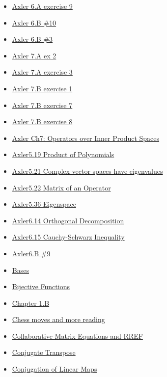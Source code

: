 \documentclass[11pt]{article}
\begin{document}
\begin{itemize}
\begin{itemize}
\item \href{math530/KBe21math530retAxler6A9.org}{Axler 6.A exercise 9}
\item \href{math530/KBe21math530retAxler6B10.org}{Axler 6.B \#10}
\item \href{math530/KBe21math530retAxler6B3.org}{Axler 6.B \#3}
\item \href{math530/KBe21math530retAxler7A2.org}{Axler 7.A ex 2}
\item \href{math530/KBe21math530retAxler7A3.org}{Axler 7.A exercise 3}
\item \href{math530/KBe21math530retAxler7B1.org}{Axler 7.B exercise 1}
\item \href{math530/KBe21math530retAxler7B7.org}{Axler 7.B exercise 7}
\item \href{math530/KBe21math530retAxler7B8.org}{Axler 7.B exercise 8}
\item \href{math530/KBrefOperatorsOverInnerProductSpaces.org}{Axler Ch7: Operators over Inner Product Spaces}
\item \href{math530/KBrefProductOfPolynomials.org}{Axler5.19 Product of Polynomials}
\item \href{math530/KBrefComplexOperatorsHaveEigenvalues.org}{Axler5.21 Complex vector spaces have eigenvalues}
\item \href{math530/KBrefMatrixOfAnOperator.org}{Axler5.22 Matrix of an Operator}
\item \href{math530/KBrefEigenspace.org}{Axler5.36 Eigenspace}
\item \href{math530/KBrefOrthogonalDecomposition.org}{Axler6.14 Orthogonal Decomposition}
\item \href{math530/KBrefCauchySchwarzInequality.org}{Axler6.15 Cauchy-Schwarz Inequality}
\item \href{math530/KBe21math530retAxler6B9.org}{Axler6.B \#9}
\item \href{math530/KBeRefLinAlgBases.org}{Bases}
\item \href{math530/KBrefBijectiveFunction.org}{Bijective Functions}
\item \href{math530/KBxChapter1B.org}{Chapter 1.B}
\item \href{math530/KBxChessMovesandMoreReading.org}{Chess moves and more reading}
\item \href{math530/KBe20math530retCollaborativeMatrixEquationsRREF.org}{Collaborative Matrix Equations and RREF}
\item \href{math530/KBrefConjugateTranspose.org}{Conjugate Transpose}
\item \href{math530/KBrefLinearMapConjugation.org}{Conjugation of Linear Maps}

\end{itemize}
\end{itemize}
\end{document}
